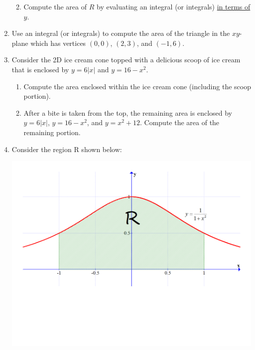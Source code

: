 \documentclass[12pt]{article}
\newif\ifans
\begin{document}
\begin{enumerate}
\begin{enumerate}
\ifans{\fbox{$\int_{0}^{\frac{1}{2}} 7x \,dx + \int_{\frac{1}{2}}^4 (4-x) \,dx= 7$}} \fi

\item Compute the area of $R$ by evaluating an integral (or integrals) \underline{in terms of $y$}.

\ifans{\fbox{$\int_0^4 \frac{7}{8}y \,dy=7$}} \fi

\end{enumerate}

\item Use an integral (or integrals) to compute the area of the triangle in the $xy$-plane which has vertices $(0,0)$, $(2,3)$, and $(-1,6)$.

\ifans{\fbox{$\frac{15}{2}$}} \fi

\item Consider the 2D ice cream cone topped with a delicious scoop of ice cream that is enclosed by $y=6|x|$ and $y=16-x^2$.

\begin{enumerate}

\item Compute the area enclosed within the ice cream cone (including the scoop portion).

\ifans{\fbox{$\frac{104}{3}$}} \fi

\item After a bite is taken from the top, the remaining area is enclosed by $y=6|x|$, $y=16-x^2$, and $y=x^2+12$.  Compute the area of the remaining portion.

\ifans{\fbox{$\frac{104}{3}-\frac{16\sqrt{2}}{3}$}} \fi

\end{enumerate}

\item Consider the region R shown below:

\begin{center}

\includegraphics[scale=0.3]{area.pdf}


\end{center}
\end{enumerate}
\end{document}
